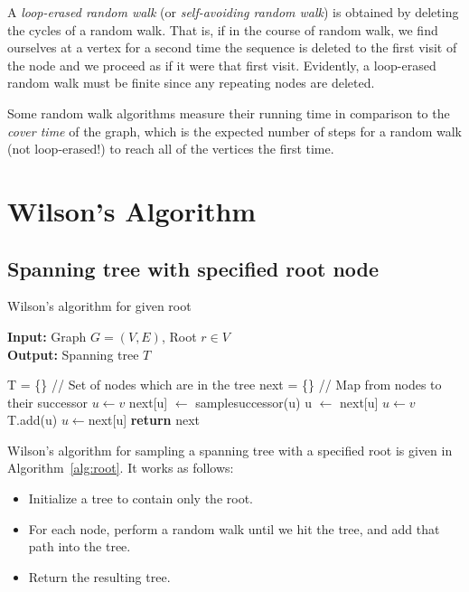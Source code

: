 \documentclass[11pt]{article}
\begin{document}
A \emph{loop-erased random walk} (or \emph{self-avoiding random walk}) is
obtained by deleting the cycles of a random walk. That is, if in the course of
random walk, we find ourselves at a vertex for a second time the sequence is
deleted to the first visit of the node and we proceed as if it were that first
visit. Evidently, a loop-erased random walk must be finite since any repeating
nodes are deleted.

Some random walk algorithms measure their running time in
comparison to the \emph{cover time} of the graph, which is the expected number
of steps for a random walk (not loop-erased!) to reach all of the vertices the
first time.


\section{Wilson's Algorithm}\label{wilson}
\subsection{Spanning tree with specified root node}
\begin{algorithm}
\caption{Wilson's algorithm for given root}
\label{alg:root}
\textbf{Input: }Graph $G=(V,E)$, Root $r \in V$ \\
\textbf{Output: }Spanning tree $T$ \\
\begin{algorithmic}[1]
\STATE T = \{\}                   // Set of nodes which are in the tree
\STATE next = \{\}                // Map from nodes to their successor
\STATE $u \leftarrow v$
\label{walk}
\STATE next[u] $\leftarrow$ samplesuccessor(u)
\STATE u $\leftarrow$ next[u]
\ENDWHILE \label{endwalk}
\STATE $u \leftarrow v$
 \label{adjoin}
\STATE T.add(u)
\STATE $u \leftarrow $next[u]
\ENDWHILE \label{endadjoin}
\ENDFOR
\STATE \textbf{return} next
\end{algorithmic}
\end{algorithm}

Wilson's algorithm for sampling a spanning tree with a specified root is given
in Algorithm~\ref{alg:root}. It works as follows:
\begin{itemize}
\item Initialize a tree to contain only the root.
\item For each node, perform a random walk until we hit the tree, and add that
path into the tree.
\item Return the resulting tree.
\end{itemize}
\end{document}
